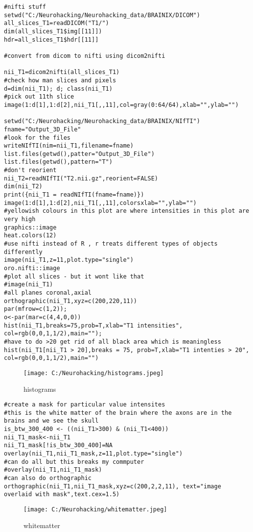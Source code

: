 \documentclass[]{article}
\begin{document}
\begin{verbatim}
#nifti stuff
setwd("C:/Neurohacking/Neurohacking_data/BRAINIX/DICOM")
all_slices_T1=readDICOM("T1/")
dim(all_slices_T1$img[[11]])
hdr=all_slices_T1$hdr[[11]]

#convert from dicom to nifti using dicom2nifti

nii_T1=dicom2nifti(all_slices_T1)
#check how man slices and pixels
d=dim(nii_T1); d; class(nii_T1)
#pick out 11th slice
image(1:d[1],1:d[2],nii_T1[,,11],col=gray(0:64/64),xlab="",ylab="")

setwd("C:/Neurohacking/Neurohacking_data/BRAINIX/NIfTI")
fname="Output_3D_File"
#look for the files
writeNIfTI(nim=nii_T1,filename=fname)
list.files(getwd(),patter="Output_3D_File")
list.files(getwd(),pattern="T")
#don't reorient 
nii_T2=readNIfTI("T2.nii.gz",reorient=FALSE)
dim(nii_T2)
print({nii_T1 = readNIfTI(fname=fname)})   
image(1:d[1],1:d[2],nii_T1[,,11],colorsxlab="",ylab="")
#yellowish colours in this plot are where intensities in this plot are very high
graphics::image
heat.colors(12)
#use nifti instead of R , r treats different types of objects differently
image(nii_T1,z=11,plot.type="single")
oro.nifti::image
#plot all slices - but it wont like that
#image(nii_T1)
#all planes coronal,axial
orthographic(nii_T1,xyz=c(200,220,11))
par(mfrow=c(1,2));
o<-par(mar=c(4,4,0,0))
hist(nii_T1,breaks=75,prob=T,xlab="T1 intensities", col=rgb(0,0,1,1/2),main="");
#have to do >20 get rid of all black area which is meaningless
hist(nii_T1[nii_T1 > 20],breaks = 75, prob=T,xlab="T1 intenties > 20", col=rgb(0,0,1,1/2),main="")
\end{verbatim}

\begin{figure}
\centering
\texttt{[image: C:/Neurohacking/histograms.jpeg]}
\caption{histograms}
\end{figure}

\begin{verbatim}
#create a mask for particular value intensites
#this is the white matter of the brain where the axons are in the brains and we see the skull
is_btw_300_400 <- ((nii_T1>300) & (nii_T1<400))
nii_T1_mask<-nii_T1
nii_T1_mask[!is_btw_300_400]=NA
overlay(nii_T1,nii_T1_mask,z=11,plot.type="single")
#can do all but this breaks my commputer
#overlay(nii_T1,nii_T1_mask)
#can also do orthographic
orthographic(nii_T1,nii_T1_mask,xyz=c(200,2,2,11), text="image overlaid with mask",text.cex=1.5)
\end{verbatim}

\begin{figure}
\centering
\texttt{[image: C:/Neurohacking/whitematter.jpeg]}
\caption{whitematter}
\end{figure}
\end{document}
